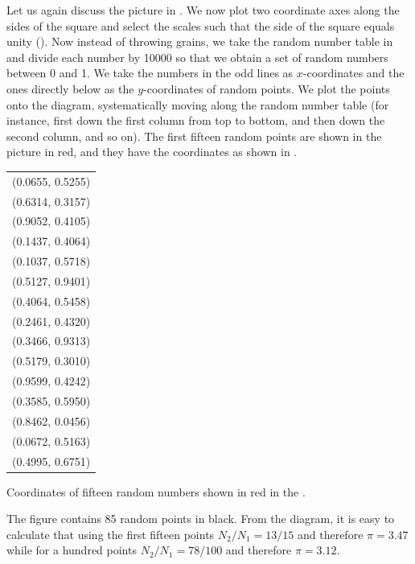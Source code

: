  Let us again discuss the picture in . We now plot two coordinate axes along the sides of the square and select the scales such that the side of the square equals unity (). Now instead of throwing grains, we take the random number table in  and divide each number by \num{10000} so that we obtain a set of random numbers between 0 and 1. We take the numbers in the odd lines as $x$-coordinates and the ones directly below as the $y$-coordinates of random points. We plot the points onto the diagram, systematically
moving along the random number table (for instance, first down the first
column from top to bottom, and then down the second column, and so
on). The first fifteen random points are shown in the picture in red, and
they have the coordinates as shown in .%
\begin{margintable}[-2cm]
\centering
\begin{smaller}
\begin{tabular}{l}
(0.0655, 0.5255) \\
 (0.6314, 0.3157) \\
  (0.9052, 0.4105) \\
(0.1437, 0.4064) \\
 (0.1037, 0.5718) \\
  (0.5127, 0.9401) \\
(0.4064, 0.5458) \\ 
(0.2461, 0.4320) \\ 
(0.3466, 0.9313) \\ 
(0.5179, 0.3010) \\ 
(0.9599, 0.4242) \\
 (0.3585, 0.5950) \\ 
(0.8462, 0.0456) \\
 (0.0672, 0.5163) \\
  (0.4995, 0.6751) \\
\end{tabular}
\end{smaller}
\caption{Coordinates of fifteen random numbers shown in red in the . \label{random-coord}}
\end{margintable}
The figure contains 85 random points in black. From
the diagram, it is easy to calculate that using the first fifteen points
$N_{2}/N_{1}= 13/15$ and therefore $\pi = 3.47$ while for a hundred points
$N_{2}/N_{1}= 78/100$ and therefore $\pi = 3.12$.

